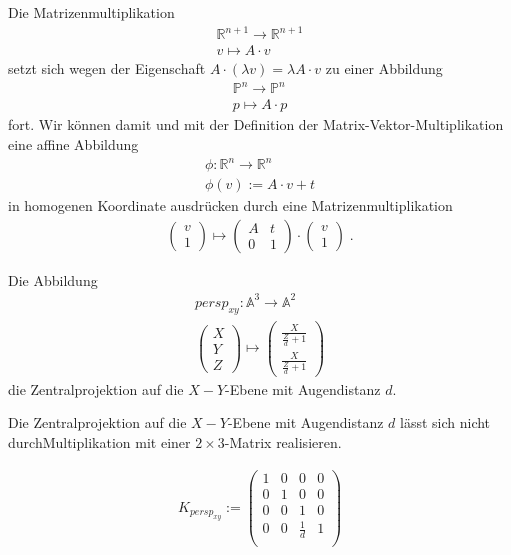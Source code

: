Die Matrizenmultiplikation
\begin{align*}
\mathbb{R}^{n+1} \to \mathbb{R}^{n+1} \\
v \mapsto A \cdot v
\end{align*}
setzt sich wegen der Eigenschaft $A \cdot (\lambda v) = \lambda A \cdot v$ zu einer Abbildung
\begin{align*}
\mathbb{P}^{n} \to \mathbb{P}^{n} \\
p \mapsto A \cdot p
\end{align*}
fort. Wir können damit und mit der Definition der Matrix-Vektor-Multiplikation eine affine Abbildung 
\begin{align*}
\phi : \mathbb{R}^{n} \to \mathbb{R}^{n} \\
\phi(v):=  A \cdot v + t
\end{align*}
in homogenen Koordinate ausdrücken durch eine Matrizenmultiplikation
\begin{align*}
\begin{pmatrix} v \\ 1\end{pmatrix} \mapsto \begin{pmatrix}  A  & t  \\ 0 &1\end{pmatrix} \cdot  \begin{pmatrix} v \\ 1\end{pmatrix}   \; .
\end{align*}

\begin{Definition}
Die Abbildung 
\begin{align*}
persp_{xy} : \mathbb{A}^3 \to \mathbb{A}^2 \\
\begin{pmatrix}  X \\ Y \\ Z\end{pmatrix}  \mapsto \begin{pmatrix}  \frac{X}{\frac{Z}{d} +1 } \\   \frac{X}{\frac{Z}{d} +1 } \end{pmatrix}
\end{align*}
die Zentralprojektion auf die $X-Y$-Ebene mit Augendistanz $d$.
\end{Definition} 

\begin{Bemerkung}
Die Zentralprojektion auf die $X-Y$-Ebene mit Augendistanz $d$ lässt sich nicht durchMultiplikation mit einer  $2 \times 3$-Matrix realisieren.
\end{Bemerkung}


\begin{align*}
K_{persp_{xy}} := \begin{pmatrix}  
1   &  0 & 0 & 0  \\
0   &  1 & 0 & 0  \\
0   &  0 & 1 & 0  \\
0   &  0 & \frac{1}{d} & 1  \\
\end{pmatrix} 
\end{align*}

